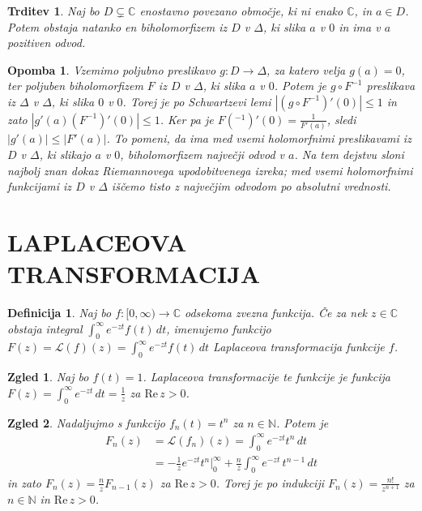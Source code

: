 \documentclass[10pt, a4paper]{article}
\newtheorem{trditev}[izr]{Trditev}
\newtheorem{defi}{Definicija}[section]
\newenvironment{noticeB}{%
  \tcolorbox[%
  notitle,
  empty,
  enhanced,  %
  breakable,
  coltext=black,
  colback=white, 
  fontupper=\rmfamily,
  parbox=false,
  noparskip,
  sharp corners,
  boxrule=-1pt,  %
  frame hidden,
  left=7pt,  %
  right=7pt,
  top=5pt,
  bottom=5pt,
  before skip=2.5ex plus 2pt,
  after skip=2.5ex plus 2pt,
  borderline west = {1.5pt}{-0.1pt}{blue!30!black}, %
  overlay unbroken and last={%
    \draw[color=black, line width=1.25pt]
    ($(frame.south west)+(1.pt, -0.1pt)$) -- ++(2em, 0);
  }
  ]}
{\endtcolorbox}
\newenvironment{definicija}{\begin{defi}\begin{noticeB}}{%
    \end{noticeB}\end{defi}}
\newtheorem*{opomba}{Opomba}
\newtheorem{zgled}{Zgled}[section]
\newcommand{\N}{\mathbb {N}}
\newcommand{\C}{\mathbb {C}}
\newcommand{\re}{\mathrm{Re}\,}
\begin{document}
\begin{trditev}
  Naj bo $D \subsetneq \C$ enostavno povezano območje, ki ni enako $\C$, in $a \in D$.
  Potem obstaja natanko en biholomorfizem iz $D$ v $\Delta$, ki slika $a$ v $0$ in ima v $a$ pozitiven odvod.
\end{trditev}

\begin{opomba}
  Vzemimo poljubno preslikavo $g: D \to \Delta$, za katero velja $g(a) = 0$, ter poljuben biholomorfizem $F$ 
  iz $D$ v $\Delta$, ki slika $a$ v $0$. Potem je $g \circ F^{-1}$ preslikava iz $\Delta$ v $\Delta$,
  ki slika $0$ v $0$. Torej je po Schwartzevi lemi $|(g \circ F^{-1})' (0)| \leq 1$ 
  in zato $|g'(a) (F^{-1})' (0)| \leq 1$. Ker pa je $F(^{-1})'(0) = \frac{1}{F'(a)}$, sledi 
  $|g'(a)| \leq |F'(a)|$. To pomeni, da ima med vsemi holomorfnimi preslikavami iz $D$ v $\Delta$,
  ki slikajo $a$ v $0$, biholomorfizem največji odvod v $a$. Na tem dejstvu sloni najbolj znan 
  dokaz Riemannovega upodobitvenega izreka; med vsemi holomorfnimi funkcijami iz $D$ v $\Delta$ iščemo tisto z največjim
  odvodom po absolutni vrednosti.
\end{opomba}

\clearpage
\section{LAPLACEOVA TRANSFORMACIJA}

\begin{definicija}
  Naj bo $f: [0, \infty) \to \C$ odsekoma zvezna funkcija.
  Če za nek $z \in \C$ obstaja integral $\int_0 ^\infty e^{-zt} f(t)\, dt$,
  imenujemo funkcijo $F(z) = \mathcal{L} (f) (z) = \int_0 ^\infty e^{-zt} f(t)\, dt$
  Laplaceova transformacija funkcije $f$.
\end{definicija}

\begin{zgled}
  Naj bo $f(t) = 1$. Laplaceova transformacije te funkcije je funkcija 
  $F(z) = \int_0 ^\infty e^{-zt}\, dt = \frac{1}{z}$ za $\mathrm{Re}\, z > 0$.
\end{zgled}

\begin{zgled}
  Nadaljujmo s funkcijo $f_n (t) = t^n$ za $n \in \N$.
  Potem je 
  \begin{align*}
    F_n (z) &= \mathcal{L} (f_n) (z) = \int_0 ^\infty e^{-zt} t^n\, dt\\
    &= -\frac{1}{z} e^{-zt} t^n \big|_0 ^\infty + \frac{n}{z} \int_0 ^\infty e^{-zt}\, t^{n - 1}\, dt
  \end{align*}
  in zato $F_n (z) = \frac{n}{z} F_{n - 1} (z)$ za $\re z > 0$.
  Torej je po indukciji $F_n (z) = \frac{n!}{z^{n + 1}}$ za $n \in \N$ in $\re z > 0$.
\end{zgled}
\end{document}
